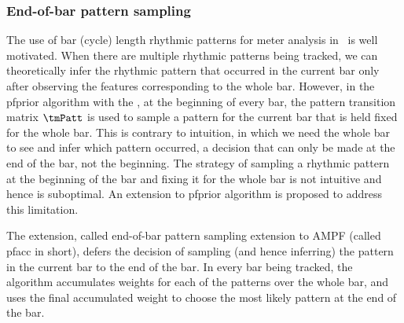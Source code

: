 \subsubsection{End-of-bar pattern sampling}
The use of bar (cycle) length rhythmic patterns for meter analysis in \bpmodel\ is well motivated. When there are multiple rhythmic patterns being tracked, we can theoretically infer the rhythmic pattern that occurred in the current bar only after observing the features corresponding to the whole bar. However, in the \acrshort{pfprior} algorithm with the \bpmodel, at the beginning of every bar, the pattern transition matrix $\tmPatt$ is used to sample a pattern for the current bar that is held fixed for the whole bar. This is contrary to intuition, in which we need the whole bar to see and infer which pattern occurred, a decision that can only be made at the end of the bar, not the beginning. The strategy of sampling a rhythmic pattern at the beginning of the bar and fixing it for the whole bar is not intuitive and hence is suboptimal. An extension to \acrshort{pfprior} algorithm is proposed to address this limitation. 

The extension, called end-of-bar pattern sampling extension to \gls{AMPF} (called \acrshort{pfacc} in short), defers the decision of sampling (and hence inferring) the pattern in the current bar to the end of the bar. In every bar being tracked, the algorithm accumulates weights for each of the patterns over the whole bar, and uses the final accumulated weight to choose the most likely pattern at the end of the bar. %

